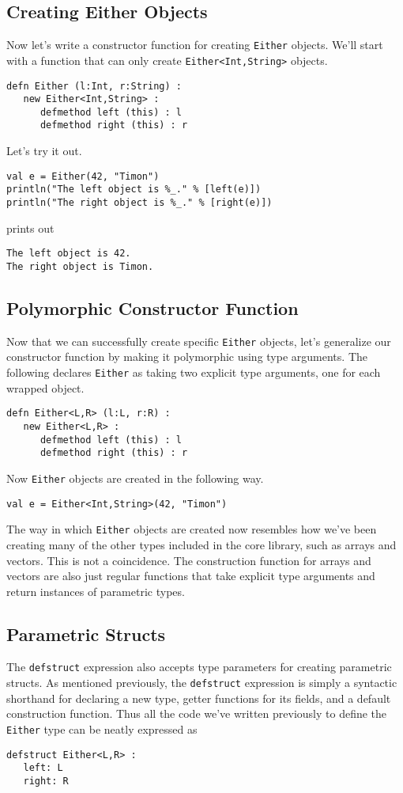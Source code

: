 \documentclass[10pt,oneside]{book}
\begin{document}
\subsection*{Creating Either Objects}
Now let's write a constructor function for creating \texttt{\frenchspacing Either} objects. We'll start with a function that can only create \texttt{\frenchspacing Either<Int,String>} objects.
\begin{lstlisting}
defn Either (l:Int, r:String) :
   new Either<Int,String> :
      defmethod left (this) : l
      defmethod right (this) : r
\end{lstlisting}
Let's try it out.
\begin{lstlisting}
val e = Either(42, "Timon")
println("The left object is %_." % [left(e)])
println("The right object is %_." % [right(e)])
\end{lstlisting}
prints out
\begin{lstlisting}
The left object is 42.
The right object is Timon.
\end{lstlisting}

\subsection*{Polymorphic Constructor Function}
Now that we can successfully create specific \texttt{\frenchspacing Either} objects, let's generalize our constructor function by making it polymorphic using type arguments. The following declares \texttt{\frenchspacing Either} as taking two explicit type arguments, one for each wrapped object.
\begin{lstlisting}
defn Either<L,R> (l:L, r:R) :
   new Either<L,R> :
      defmethod left (this) : l
      defmethod right (this) : r
\end{lstlisting}
Now \texttt{\frenchspacing Either} objects are created in the following way.
\begin{lstlisting}
val e = Either<Int,String>(42, "Timon")
\end{lstlisting}
The way in which \texttt{\frenchspacing Either} objects are created now resembles how we've been creating many of the other types included in the core library, such as arrays and vectors. This is not a coincidence. The construction function for arrays and vectors are also just regular functions that take explicit type arguments and return instances of parametric types.

\subsection*{Parametric Structs}
The \texttt{\frenchspacing defstruct} expression also accepts type parameters for creating parametric structs. As mentioned previously, the \texttt{\frenchspacing defstruct} expression is simply a syntactic shorthand for declaring a new type, getter functions for its fields, and a default construction function. Thus all the code we've written previously to define the \texttt{\frenchspacing Either} type can be neatly expressed as
\begin{lstlisting}
defstruct Either<L,R> :
   left: L
   right: R
\end{lstlisting}
\end{document}
